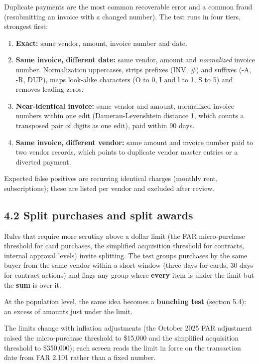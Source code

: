 \documentclass[letterpaper,11pt]{article}
\providecommand{\tightlist}{\setlength{\itemsep}{0pt}\setlength{\parskip}{0pt}}
\begin{document}
Duplicate payments are the most common recoverable error and a common
fraud (resubmitting an invoice with a changed number). The test runs in
four tiers, strongest first:

\begin{enumerate}
\def\labelenumi{\arabic{enumi}.}
\tightlist
\item
  \textbf{Exact:} same vendor, amount, invoice number and date.
\item
  \textbf{Same invoice, different date:} same vendor, amount and
  \emph{normalized} invoice number. Normalization uppercases, strips
  prefixes (INV, \#) and suffixes (-A, -R, DUP), maps look-alike
  characters (O to 0, I and l to 1, S to 5) and removes leading zeros.
\item
  \textbf{Near-identical invoice:} same vendor and amount, normalized
  invoice numbers within one edit (Damerau-Levenshtein distance 1, which
  counts a transposed pair of digits as one edit), paid within 90 days.
\item
  \textbf{Same invoice, different vendor:} same amount and invoice
  number paid to two vendor records, which points to duplicate vendor
  master entries or a diverted payment.
\end{enumerate}

Expected false positives are recurring identical charges (monthly rent,
subscriptions); these are listed per vendor and excluded after review.

\hypertarget{split-purchases-and-split-awards}{%
\subsection*{4.2 Split purchases and split
awards}\label{split-purchases-and-split-awards}}

Rules that require more scrutiny above a dollar limit (the FAR
micro-purchase threshold for card purchases, the simplified acquisition
threshold for contracts, internal approval levels) invite splitting. The
test groups purchases by the same buyer from the same vendor within a
short window (three days for cards, 30 days for contract actions) and
flags any group where \textbf{every} item is under the limit but the
\textbf{sum} is over it.

At the population level, the same idea becomes a \textbf{bunching test}
(section 5.4): an excess of amounts just under the limit.

The limits change with inflation adjustments (the October 2025 FAR
adjustment raised the micro-purchase threshold to \$15,000 and the
simplified acquisition threshold to \$350,000); each screen reads the
limit in force on the transaction date from FAR 2.101 rather than a
fixed number.
\end{document}
